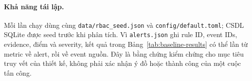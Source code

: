 \paragraph{Khả năng tái lập.}
Mỗi lần chạy dùng cùng \texttt{data/rbac\_seed.json} và
\texttt{config/default.toml}; CSDL SQLite được seed trước khi phân tích. Vì
\texttt{alerts.json} ghi rule ID, event IDs, evidence, điểm và severity, kết
quả trong Bảng~\ref{tab:baseline-results} có thể lần từ metric về alert, rồi
về event nguồn. Đây là bằng chứng kiểm chứng cho mục tiêu truy vết của thiết
kế, không phải xác nhận ý đồ hoặc thành công của một cuộc tấn công.
